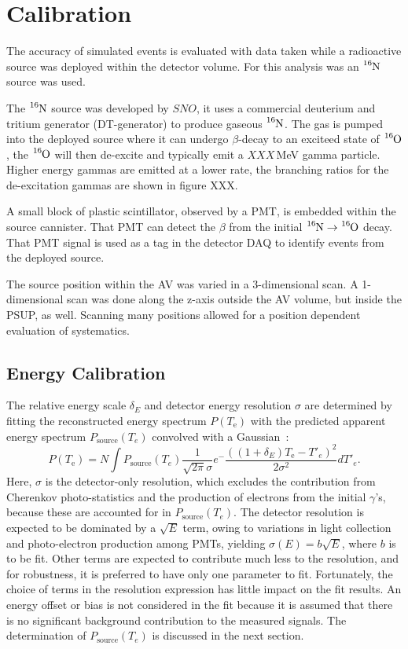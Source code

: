 \section{Calibration}
The accuracy of simulated events is evaluated with data taken while a
radioactive source was deployed within the detector volume.
For this analysis was an $\ce{^{16}N}$ source was used.

The $\ce{^{16}N}$ source was developed by $SNO$, it uses a commercial
deuterium and tritium generator (DT-generator) to produce gaseous $\ce{^{16}N}$.
The gas is pumped into the deployed source where it can undergo $\beta$-decay
to an exciteed state of $\ce{^{16}O}$, the $\ce{^{16}O}$ will then de-excite
and typically emit a $XXX$\,MeV gamma particle. Higher energy gammas are emitted
at a lower rate, the branching ratios for the de-excitation gammas are shown in
figure XXX.

A small block of plastic scintillator, observed by a PMT, is embedded within the
source cannister. That PMT can detect the $\beta$ from the initial
$\ce{^{16}N} \rightarrow \ce{^{16}O}$ decay. That PMT signal is used as a
tag in the detector DAQ to identify events from the deployed source.

The source position within the AV was varied in a 3-dimensional
scan.
A 1-dimensional scan was done along the z-axis outside the AV volume,
but inside the PSUP, as well.
Scanning many positions allowed for a position dependent evaluation of
systematics.

\subsection{Energy Calibration}

The relative energy scale $\delta_E$ and detector energy resolution $\sigma$
are determined by fitting the reconstructed energy spectrum $P(T_\mathrm{e})$
with the predicted apparent energy spectrum $P_\mathrm{source}(T_e)$ convolved
with a Gaussian~\cite{Dunford:2006qb}:
\begin{equation}
  P(T_\mathrm{e}) = N \int P_\mathrm{source}(T_e)\frac{1}{\sqrt{2\pi}\sigma}e^-{\frac{((1+\delta_E)T_\mathrm{e}-T\prime_{e})^2}{2\sigma^2}}dT\prime_{e}.%
\label{eq:convolution}
\end{equation}
Here, $\sigma$ is the detector-only resolution, which excludes the contribution
from Cherenkov photo-statistics and the production of electrons from the initial
$\gamma$'s, because these are accounted for in $P_\mathrm{source}(T_e)$.  The
detector resolution is expected to be dominated by a $\sqrt{E}$ term, owing to
variations in light collection and photo-electron production among PMTs,
yielding $\sigma(E) = b\sqrt{E}$, where $b$ is to be fit.  Other terms are
expected to contribute much less to the resolution, and for robustness, it is
preferred to have only one parameter to fit.  Fortunately, the choice of terms
in the resolution expression has little impact on the fit results.  An energy
offset or bias is not considered in the fit because
it is assumed that there is no significant background contribution to the
measured signals.  The determination of $P_\mathrm{source}(T_{e})$ is discussed in
the next section.


